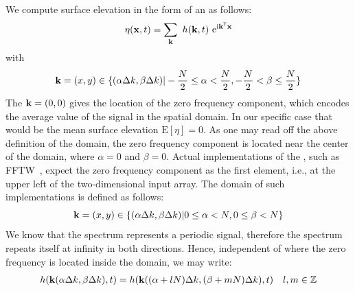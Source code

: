 \section{\DiscreteFourierTransform}
\label{sec:discrete_fourier_transform}
%
\newcommand{\ccellnum}[2]{\cellcolor{#1}\num{#2}}
\newcommand{\mcleft}[2]{\multicolumn{1}{!{\color{#1}\vline}S}{#2}}
\newcommand{\mcright}[2]{\multicolumn{1}{S !{\color{#1}\vline}}{#2}}
\newcommand{\mcleftright}[2]{\multicolumn{1}{!{\color{#1}\vline} S !{\color{#1}\vline}}{#2}}
%
%
We compute surface elevation in the form of an \InvDiscreteFourierTransform as follows:
\begin{equation}
\label{eq:surface_elevation_h_k_t}
\eta(\mathbf{x}, t) = \sum_{\mathbf{k}}~h(\mathbf{k},t)~\mathrm{e}^{\mathrm{i}\mathbf{k}^{\mathsf{T}}\mathbf{x}}
\end{equation}
with
\begin{equation*}
\mathbf{k} = (x,y)\in\{(\alpha\Delta k,\beta\Delta k)|
-\frac{N}{2}\leq\alpha<\frac{N}{2},-\frac{N}{2}<\beta\leq\frac{N}{2}\}
\end{equation*}
The \wavevector $\mathbf{k} = (0,0)$ gives the location of the zero frequency component,
which encodes the average value of the signal in the spatial domain. In our specific
case that would be the mean surface elevation $\mathrm{E}[\eta] = 0$.
As one may read off the above definition of the \wavevector domain, the zero
frequency component is located near the center of the \wavevector domain,
where $\alpha=0$ and $\beta=0$. Actual implementations of the \InvFourierTransform,
such as FFTW~\citep{FFTW05}, expect the zero frequency component as the first
element, i.e., at the upper left of the two-dimensional input array.
The \wavevector domain of such implementations is defined as follows:
\begin{equation*}
\mathbf{k} = (x,y)\in\{(\alpha\Delta k,\beta\Delta k)|
0\leq\alpha<N,0\leq\beta<N\}
\end{equation*}
%
We know that the spectrum represents a periodic signal, therefore the spectrum
repeats itself at infinity in both directions. Hence, independent of where the
zero frequency is located inside the \wavevector domain, we may write:
%
\begin{align*}
 h(\mathbf{k}(\alpha\Delta k,\beta\Delta k),t) = h(\mathbf{k}((\alpha + lN)\Delta k, (\beta +mN)\Delta k),t) && l,m \in \mathbb{Z}
\end{align*}
